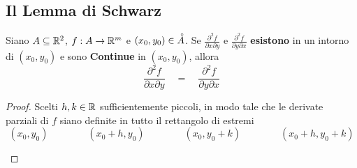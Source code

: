 \subsection{Il Lemma di Schwarz}
\begin{lemma}[di Schwarz]
	\label{lemma:schwarz}
	Siano $A \subseteq \mathbb{R}^2$, $f:A \to \mathbb{R}^m$ e $(x_0, y_0) \in \accentset{\circ}{A}$. Se $\frac{\partial^2 f}{\partial x \partial y}$ e $\frac{\partial^2 f}{\partial y \partial x}$ \textbf{esistono} in un intorno di $(x_0, y_0)$ e sono \textbf{Continue} in $(x_0, y_0)$, allora
	\[\frac{\partial^2 f}{\partial x \partial y} \quad = \quad \frac{\partial^2 f}{\partial y \partial x}\]
	\begin{proof}
		Scelti $h, k \in \mathbb{R}$ sufficientemente piccoli, in modo tale che le derivate parziali di $f$ siano definite in tutto il rettangolo di estremi
		\[(x_0, y_0) \qquad\qquad (x_0 + h, y_0) \qquad\qquad (x_0, y_0 + k) \qquad\qquad (x_0 + h, y_0 + k)\]
		\begin{center}
\end{center}
\end{proof}
\end{lemma}
